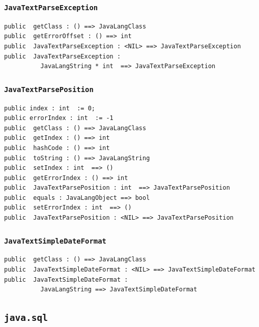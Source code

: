\documentclass[\pformat,12pt]{article}
\begin{document}
\subsubsection{\texttt{JavaTextParseException}}
\begin{small}
\begin{verbatim}
public  getClass : () ==> JavaLangClass
public  getErrorOffset : () ==> int
public  JavaTextParseException : <NIL> ==> JavaTextParseException
public  JavaTextParseException : 
          JavaLangString * int  ==> JavaTextParseException
\end{verbatim}
\end{small}

\subsubsection{\texttt{JavaTextParsePosition}}
\begin{small}
\begin{verbatim}
public index : int  := 0;
public errorIndex : int  := -1
public  getClass : () ==> JavaLangClass
public  getIndex : () ==> int
public  hashCode : () ==> int
public  toString : () ==> JavaLangString
public  setIndex : int  ==> ()
public  getErrorIndex : () ==> int
public  JavaTextParsePosition : int  ==> JavaTextParsePosition
public  equals : JavaLangObject ==> bool
public  setErrorIndex : int  ==> ()
public  JavaTextParsePosition : <NIL> ==> JavaTextParsePosition
\end{verbatim}
\end{small}

\subsubsection{\texttt{JavaTextSimpleDateFormat}}
\begin{small}
\begin{verbatim}
public  getClass : () ==> JavaLangClass
public  JavaTextSimpleDateFormat : <NIL> ==> JavaTextSimpleDateFormat
public  JavaTextSimpleDateFormat : 
          JavaLangString ==> JavaTextSimpleDateFormat
\end{verbatim}
\end{small}

\subsection{\texttt{java.sql}}
\end{document}
